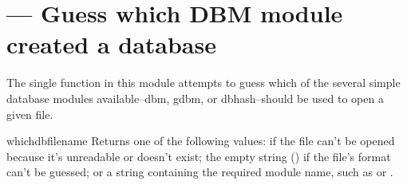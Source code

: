 \section{ ---
         Guess which DBM module created a database}



The single function in this module attempts to guess which of the
several simple database modules available--dbm, gdbm, or
dbhash--should be used to open a given file.

\begin{funcdesc}{whichdb}{filename}
Returns one of the following values:  if the file can't be
opened because it's unreadable or doesn't exist; the empty string
() if the file's format can't be guessed; or a string
containing the required module name, such as  or
.
\end{funcdesc}

